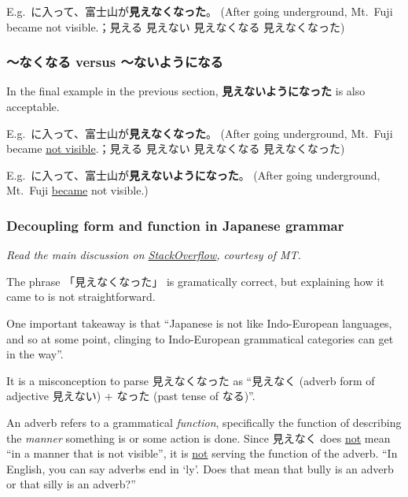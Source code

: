 \documentclass[../nihongo-gakushuu-kyouzai.tex]{subfiles}
\begin{document}
E.g.\ に入って、富士山が\textbf{見えなくなった}。 (After going underground, Mt.~Fuji became not visible.；見える \to{} 見えない \to{} 見えなくなる \to{} 見えなくなった)

\subsubsection{〜なくなる versus 〜ないようになる}
In the final example in the previous section, \textbf{見えないようになった} is also acceptable. 

E.g.\ に入って、富士山が\textbf{見えなくなった}。 (After going underground, Mt.~Fuji became \ul{not visible}.；見える \to{} 見えない \to{} 見えなくなる \to{} 見えなくなった)

E.g.\ に入って、富士山が\textbf{見えないようになった}。 (After going underground, Mt.~Fuji \ul{became} not visible.)

\subsubsection{Decoupling form and function in Japanese grammar} \label{sec:decoupling-form-and-function-in-japanese-grammar}
\emph{Read the main discussion on \href{https://japanese.stackexchange.com/a/89019}{StackOverflow}, courtesy of MT.}

The phrase 「見えなくなった」 is gramatically correct, but explaining how it came to is not straightforward.

One important takeaway is that ``Japanese is not like Indo-European languages, and so at some point, clinging to Indo-European grammatical categories can get in the way''.

It is a misconception to parse 見えなくなった as ``見えなく (adverb form of adjective 見えない) + なった (past tense of なる)''.

An adverb refers to a grammatical \emph{function}, specifically the function of describing the \emph{manner} something is or some action is done. Since 見えなく does \ul{not} mean ``in a manner that is not visible'', it is \ul{not} serving the function of the adverb. ``In English, you can say adverbs end in `ly'. Does that mean that bully is an adverb or that silly is an adverb?''
\end{document}
